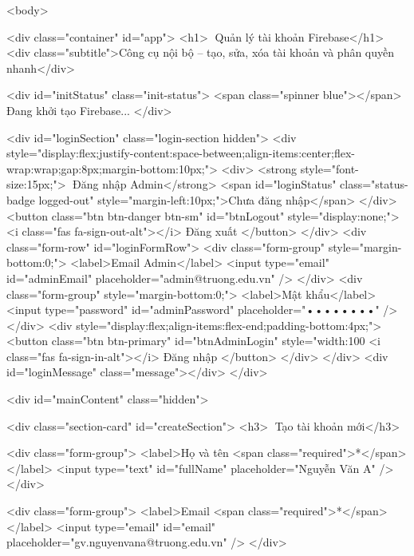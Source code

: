 <body>

    <div class="container" id="app">
        <h1>🔧 Quản lý tài khoản Firebase</h1>
        <div class="subtitle">Công cụ nội bộ – tạo, sửa, xóa tài khoản và phân quyền nhanh</div>

        <div id="initStatus" class="init-status">
            <span class="spinner blue"></span>
            Đang khởi tạo Firebase...
        </div>

        <div id="loginSection" class="login-section hidden">
            <div style="display:flex;justify-content:space-between;align-items:center;flex-wrap:wrap;gap:8px;margin-bottom:10px;">
                <div>
                    <strong style="font-size:15px;">👤 Đăng nhập Admin</strong>
                    <span id="loginStatus" class="status-badge logged-out" style="margin-left:10px;">Chưa đăng nhập</span>
                </div>
                <button class="btn btn-danger btn-sm" id="btnLogout" style="display:none;">
                    <i class="fas fa-sign-out-alt"></i> Đăng xuất
                </button>
            </div>
            <div class="form-row" id="loginFormRow">
                <div class="form-group" style="margin-bottom:0;">
                    <label>Email Admin</label>
                    <input type="email" id="adminEmail" placeholder="admin@truong.edu.vn" />
                </div>
                <div class="form-group" style="margin-bottom:0;">
                    <label>Mật khẩu</label>
                    <input type="password" id="adminPassword" placeholder="••••••••" />
                </div>
                <div style="display:flex;align-items:flex-end;padding-bottom:4px;">
                    <button class="btn btn-primary" id="btnAdminLogin" style="width:100%
                        <i class="fas fa-sign-in-alt"></i> Đăng nhập
                    </button>
                </div>
            </div>
            <div id="loginMessage" class="message"></div>
        </div>

        <div id="mainContent" class="hidden">

            <div class="section-card" id="createSection">
                <h3>📝 Tạo tài khoản mới</h3>

                <div class="form-group">
                    <label>Họ và tên <span class="required">*</span></label>
                    <input type="text" id="fullName" placeholder="Nguyễn Văn A" />
                </div>

                <div class="form-group">
                    <label>Email <span class="required">*</span></label>
                    <input type="email" id="email" placeholder="gv.nguyenvana@truong.edu.vn" />
                </div>

